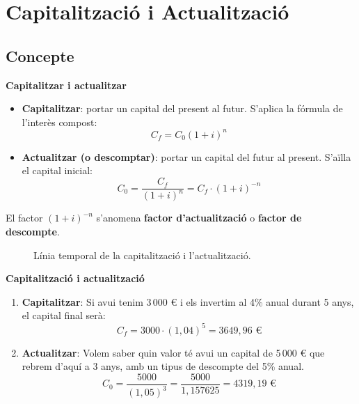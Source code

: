 \documentclass[12pt]{article}
\begin{document}
\newpage

\section{Capitalització i Actualització}

\subsection{Concepte}

\begin{concept}
\textbf{Capitalitzar i actualitzar}\\
\begin{itemize}
    \item \textbf{Capitalitzar}: portar un capital del present al futur. S'aplica la fórmula de l'interès compost:
    \[
    C_f = C_0(1+i)^n
    \]
    \item \textbf{Actualitzar (o descomptar)}: portar un capital del futur al present. S'aïlla el capital inicial:
    \[
    C_0 = \dfrac{C_f}{(1+i)^n} = C_f \cdot (1+i)^{-n}
    \]
\end{itemize}
El factor $(1+i)^{-n}$ s'anomena \textbf{factor d'actualització} o \textbf{factor de descompte}.
\end{concept}

\begin{figure}[H]
\centering
{}
\caption{Línia temporal de la capitalització i l'actualització.}
\end{figure}

\begin{exemple}
\textbf{Capitalització i actualització}
\begin{enumerate}[label=\alph*)]
    \item \textbf{Capitalitzar}: Si avui tenim 3\,000 € i els invertim al 4\% anual durant 5 anys, el capital final serà:
    \[
    C_f = 3000 \cdot (1{,}04)^5 = 3649{,}96 \text{ €}
    \]
    \item \textbf{Actualitzar}: Volem saber quin valor té avui un capital de 5\,000 € que rebrem d'aquí a 3 anys, amb un tipus de descompte del 5\% anual.
    \[
    C_0 = \dfrac{5000}{(1{,}05)^3} = \dfrac{5000}{1{,}157625} = 4319{,}19 \text{ €}
    \]
\end{enumerate}
\end{exemple}
\end{document}
